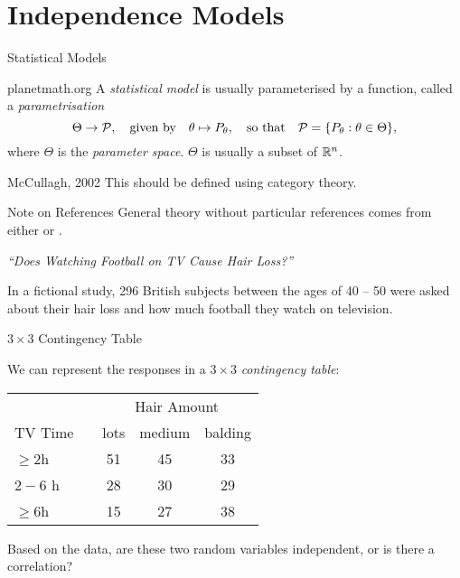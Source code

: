 \section{Independence Models}

\begin{frame}{Statistical Models}
    \begin{block}{planetmath.org}
    A \emph{statistical model} is usually parameterised by a function, called a \emph{parametrisation}
    $$ \Theta \rightarrow \mathcal{P}, \quad \text{given by} \quad \theta \mapsto P_{\theta},\quad \text{so that}\quad \mathcal{P} = \{ P_{\theta} : \theta \in \Theta \}, $$
    where $\Theta$ is the \emph{parameter space}. $\Theta$ is usually a subset of $\mathbb{R}^{n}$.
    \end{block}

    \begin{block}{McCullagh, 2002 \cite{PM2002}}
    This should be defined using category theory.
    \end{block}

    \begin{block}{Note on References}
        General theory without particular references comes from either \cite{BSLP2005} or \cite{BSSSMD2009}.
    \end{block}
\end{frame}

\begin{frame}{\emph{``Does Watching Football on TV Cause Hair Loss?''}}
    
    In a fictional study, 296 British subjects between the ages of 40 -- 50 were asked about their hair loss and how much football they watch on television.
        
    \begin{block}{$3 \times 3$ Contingency Table}

    We can represent the responses in a $3\times 3$ \emph{contingency table}:

    \begin{table}[h]
        \begin{tabular}{@{}lcccc@{}} 
        & &  \multicolumn{3}{c}{Hair Amount}\\\cmidrule{3-5} 
        TV Time & & lots & medium & balding\\ \midrule 
        $\geq 2$h & & 51 & 45 & 33 \\ 
        $2-6$ h & & 28 & 30 & 29 \\ 
        $\geq 6$h & & 15 & 27 & 38\\\bottomrule
        \end{tabular}
    \end{table} 
    \end{block}

    Based on the data, are these two random variables independent, or is there a correlation?

\end{frame}

